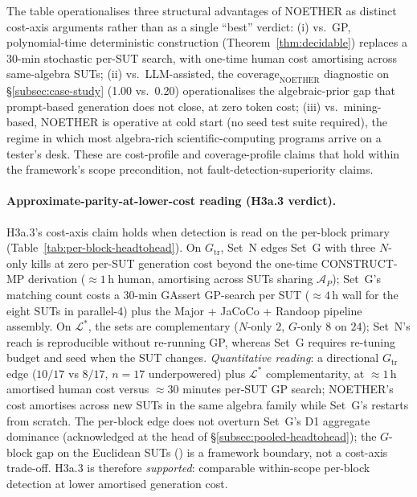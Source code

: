 \documentclass[manuscript]{acmart}
\begin{document}
The table operationalises three structural advantages of NOETHER as distinct cost-axis arguments rather than as a single ``best'' verdict: (i) vs.\ GP, polynomial-time deterministic construction (Theorem~\ref{thm:decidable}) replaces a 30-min stochastic per-SUT search, with one-time human cost amortising across same-algebra SUTs; (ii) vs.\ LLM-assisted, the $\mathrm{coverage}_{\mathrm{NOETHER}}$ diagnostic on \S\ref{subsec:case-study} (1.00 vs.\ 0.20) operationalises the algebraic-prior gap that prompt-based generation does not close, at zero token cost; (iii) vs.\ mining-based, NOETHER is operative at cold start (no seed test suite required), the regime in which most algebra-rich scientific-computing programs arrive on a tester's desk. These are cost-profile and coverage-profile claims that hold within the framework's scope precondition, not fault-detection-superiority claims.

\paragraph{Approximate-parity-at-lower-cost reading (H3a.3 verdict).}
\label{para:cost-axis-h3a}
H3a.3's cost-axis claim holds when detection is read on the per-block primary (Table~\ref{tab:per-block-headtohead}). On $G_{\mathrm{tr}}$, Set~N edges Set~G with three $N$-only kills at zero per-SUT generation cost beyond the one-time CONSTRUCT-MP derivation ($\approx 1$\,h human, amortising across SUTs sharing $\mathcal{A}_P$); Set~G's matching count costs a 30-min GAssert GP-search per SUT ($\approx 4$\,h wall for the eight SUTs in parallel-4) plus the Major + JaCoCo + Randoop pipeline assembly. On $\mathcal{L}^{*}$, the sets are complementary ($N$-only $2$, $G$-only $8$ on $24$); Set~N's reach is reproducible without re-running GP, whereas Set~G requires re-tuning budget and seed when the SUT changes. \emph{Quantitative reading}: a directional $G_{\mathrm{tr}}$ edge ($10/17$ vs $8/17$, $n=17$ underpowered) plus $\mathcal{L}^{*}$ complementarity, at $\approx 1$\,h amortised human cost versus $\approx 30$ minutes per-SUT GP search; NOETHER's cost amortises across new SUTs in the same algebra family while Set~G's restarts from scratch. The per-block edge does not overturn Set~G's D1 aggregate dominance (acknowledged at the head of \S\ref{subsec:pooled-headtohead}); the $G$-block gap on the Euclidean SUTs () is a framework boundary, not a cost-axis trade-off. H3a.3 is therefore \emph{supported}: comparable within-scope per-block detection at lower amortised generation cost.
\end{document}
